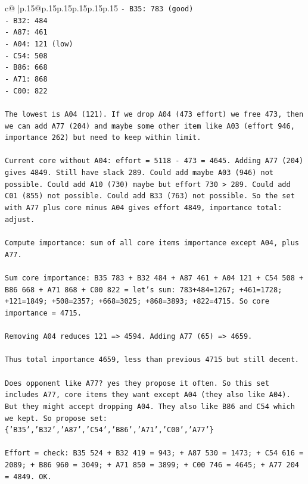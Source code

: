 \documentclass{article}
\begin{document}
{\begin{supertabular}{c@{$\;$}|p{.15\linewidth}@{}p{.15\linewidth}p{.15\linewidth}p{.15\linewidth}p{.15\linewidth}p{.15\linewidth}}
{{{\texttt{{-} B35: 783 (good)} \\
\texttt{{-} B32: 484} \\
\texttt{{-} A87: 461} \\
\texttt{{-} A04: 121 (low)} \\
\texttt{{-} C54: 508} \\
\texttt{{-} B86: 668} \\
\texttt{{-} A71: 868} \\
\texttt{{-} C00: 822} \\
\\ 
\texttt{The lowest is A04 (121). If we drop A04 (473 effort) we free 473, then we can add A77 (204) and maybe some other item like A03 (effort 946, importance 262) but need to keep within limit.} \\
\\ 
\texttt{Current core without A04: effort = 5118 {-} 473 = 4645. Adding A77 (204) gives 4849. Still have slack 289. Could add maybe A03 (946) not possible. Could add A10 (730) maybe but effort 730 > 289. Could add C01 (855) not possible. Could add B33 (763) not possible. So the set with A77 plus core minus A04 gives effort 4849, importance total: adjust.} \\
\\ 
\texttt{Compute importance: sum of all core items importance except A04, plus A77.} \\
\\ 
\texttt{Sum core importance: B35 783 + B32 484 + A87 461 + A04 121 + C54 508 + B86 668 + A71 868 + C00 822 = let's sum: 783+484=1267; +461=1728; +121=1849; +508=2357; +668=3025; +868=3893; +822=4715. So core importance = 4715.} \\
\\ 
\texttt{Removing A04 reduces 121 => 4594. Adding A77 (65) => 4659.} \\
\\ 
\texttt{Thus total importance 4659, less than previous 4715 but still decent.} \\
\\ 
\texttt{Does opponent like A77? yes they propose it often. So this set includes A77, core items they want except A04 (they also like A04). But they might accept dropping A04. They also like B86 and C54 which we kept. So propose set: \{'B35','B32','A87','C54','B86','A71','C00','A77'\}} \\
\\ 
\texttt{Effort = check: B35 524 + B32 419 = 943; + A87 530 = 1473; + C54 616 = 2089; + B86 960 = 3049; + A71 850 = 3899; + C00 746 = 4645; + A77 204 = 4849. OK.} \\
}}}
\end{supertabular}}
\end{document}
